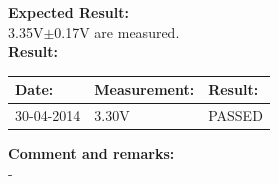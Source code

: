 \begin{figure}[H]
	\centering

\end{figure}

\textbf{Expected Result:}\\
3.35V$\pm$0.17V are measured.\\

\textbf{Result:}
\begin{table}[H]
	\centering
	\begin{tabular}{|p{2cm}|p{3cm}|p{2cm}|}\hline
		\textbf{Date:} & \textbf{Measurement:} & \textbf{Result:} \\ \hline
		30-04-2014 & 3.30V & PASSED \\ \hline
	\end{tabular}
\end{table}

\textbf{Comment and remarks:}\\
-\\

